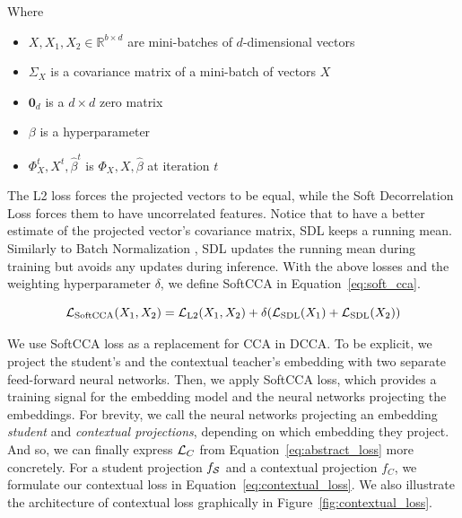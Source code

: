 Where

\begin{itemize}

  \item $X, X_1, X_2 \in \mathbb{R}^{b \times d}$ are mini-batches of
    $d$-dimensional vectors

  \item $\Sigma_{X}$ is a covariance matrix of a mini-batch of vectors $X$

  \item $\bm{0}_d$ is a $d \times d$ zero matrix

  \item $\beta$ is a hyperparameter

  \item $\Phi_X^t, X^t, \hat{\beta}^t$ is $\Phi_X, X, \hat{\beta}$ at iteration
    $t$

\end{itemize}

The L2 loss forces the projected vectors to be equal, while the Soft
Decorrelation Loss forces them to have uncorrelated features. Notice that to
have a better estimate of the projected vector's covariance matrix, SDL keeps a
running mean. Similarly to Batch Normalization \citep{ioffe2015batch}, SDL
updates the running mean during training but avoids any updates during
inference. With the above losses and the weighting hyperparameter
$\delta$, we define SoftCCA in Equation~\ref{eq:soft_cca}.

\begin{equation}\label{eq:soft_cca}
  \mathcal{L}_{\text{SoftCCA}}(X_1, X_2) = \mathcal{L}_{\text{L2}}(X_1, X_2) +
      \delta ( \mathcal{L}_{\text{SDL}}(X_1) + \mathcal{L}_{\text{SDL}}(X_2) )
\end{equation}

We use SoftCCA loss as a replacement for CCA in DCCA. To be explicit, we
project the student's and the contextual teacher's embedding with two separate
feed-forward neural networks. Then, we apply SoftCCA loss, which provides
a training signal for the embedding model and the neural
networks projecting the embeddings. For brevity, we call the neural networks
projecting an embedding \emph{student} and \emph{contextual projections}, depending on which embedding they project. And so, we can finally express $\mathcal{L}_C$ from Equation~\ref{eq:abstract_loss} more concretely.
For a student projection $f_{\mathcal{S}}$ and a contextual projection $f_C$, we
formulate our contextual loss in Equation~\ref{eq:contextual_loss}. We also
illustrate the architecture of contextual loss graphically in
Figure~\ref{fig:contextual_loss}.

